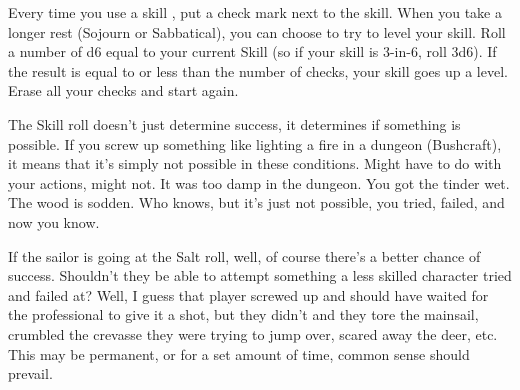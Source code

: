 {  
  Every time you use a skill , put a check mark next to the skill. When you take a longer rest (Sojourn or Sabbatical), you can choose to try to level your skill.  Roll a number of d6 equal to your current Skill (so if your skill is 3-in-6, roll 3d6). If the result is equal to or less than the number of checks, your skill goes up a level. Erase all your checks and start again.



  



  The Skill roll doesn't just determine success, it determines if something is possible.  If you screw up something like lighting a fire in a dungeon (Bushcraft), it means that it's simply not possible in these conditions.  Might have to do with your actions, might not. It was too damp in the dungeon. You got the tinder wet.  The wood is sodden. Who knows, but it's just not possible, you tried, failed, and now you know. 

  If the sailor is going at the Salt roll, well, of course there's a better chance of success. Shouldn't they be able to attempt something a less skilled character tried and failed at? Well, I guess that player screwed up and should have waited for the professional to give it a shot, but they didn't and they tore the mainsail, crumbled the crevasse they were trying to jump over, scared away the deer, etc. This may be permanent, or for a set amount of time, common sense should prevail.


}
